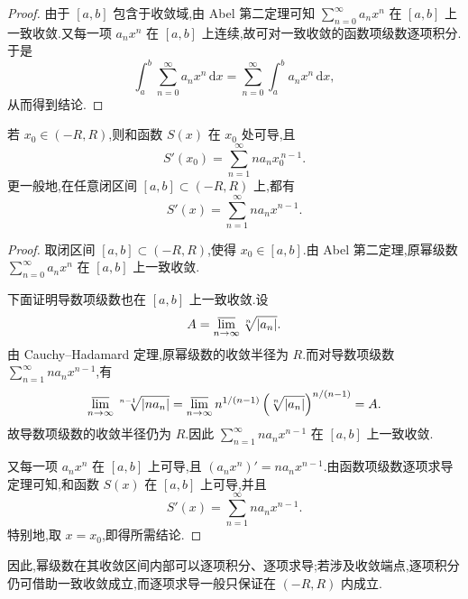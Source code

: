 \begin{proof}
	由于 \([a,b]\) 包含于收敛域,由 Abel 第二定理可知 \(\sum\limits_{n=0}^{\infty}a_nx^n\) 在 \([a,b]\) 上一致收敛.又每一项 \(a_nx^n\) 在 \([a,b]\) 上连续,故可对一致收敛的函数项级数逐项积分.于是
	\[
	\int_a^b\sum_{n=0}^{\infty}a_nx^n\,\mathrm{d}x
	=
	\sum_{n=0}^{\infty}\int_a^b a_nx^n\,\mathrm{d}x,
	\]
	从而得到结论.
\end{proof}
\begin{proposition}
		若 \(x_0\in(-R,R)\),则和函数 \(S(x)\) 在 \(x_0\) 处可导,且
	\[
	S'(x_0)=\sum_{n=1}^{\infty}na_nx_0^{\,n-1}.
	\]
	更一般地,在任意闭区间 \([a,b]\subset(-R,R)\) 上,都有
	\[
	S'(x)=\sum_{n=1}^{\infty}na_nx^{n-1}.
	\]
\end{proposition}

\begin{proof}
	取闭区间 \([a,b]\subset(-R,R)\),使得 \(x_0\in[a,b]\).由 Abel 第二定理,原幂级数 \(\sum_{n=0}^{\infty}a_nx^n\) 在 \([a,b]\) 上一致收敛.
	
	下面证明导数项级数也在 \([a,b]\) 上一致收敛.设
	\[
	A=\varlimsup_{n\to\infty}\sqrt[n]{|a_n|}.
	\]
	由 Cauchy--Hadamard 定理,原幂级数的收敛半径为 \(R\).而对导数项级数 \(\sum_{n=1}^{\infty}na_nx^{n-1}\),有
	\[
	\varlimsup_{n\to\infty}\sqrt[n-1]{|na_n|}
	=
	\varlimsup_{n\to\infty}n^{1/(n-1)}\left(\sqrt[n]{|a_n|}\right)^{n/(n-1)}
	=A.
	\]
	故导数项级数的收敛半径仍为 \(R\).因此 \(\sum_{n=1}^{\infty}na_nx^{n-1}\) 在 \([a,b]\) 上一致收敛.
	
	又每一项 \(a_nx^n\) 在 \([a,b]\) 上可导,且 \((a_nx^n)'=na_nx^{n-1}\).由函数项级数逐项求导定理可知,和函数 \(S(x)\) 在 \([a,b]\) 上可导,并且
	\[
	S'(x)=\sum_{n=1}^{\infty}na_nx^{n-1}.
	\]
	特别地,取 \(x=x_0\),即得所需结论.
\end{proof}

因此,幂级数在其收敛区间内部可以逐项积分、逐项求导;若涉及收敛端点,逐项积分仍可借助一致收敛成立,而逐项求导一般只保证在 \((-R,R)\) 内成立.

